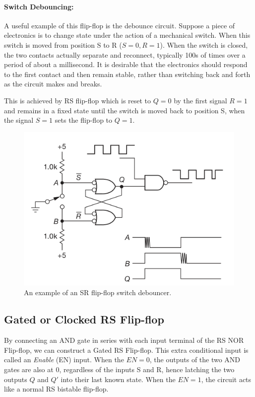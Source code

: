 \paragraph*{\textbf{Switch Debouncing:}}
A useful example of this flip-flop is the debounce circuit. Suppose a
piece of electronics is to change state under the action of a mechanical switch. When this
switch is moved from position S to R ($S=0, R=1$). When the switch is closed, the two contacts actually separate and reconnect, typically 100s of times over a period of about a millisecond. It is desirable that the electronics should respond to the first contact and then remain stable, rather than switching back and forth as the circuit makes and breaks. 

This is achieved by RS flip-flop which is reset to $Q=0$ by the first signal $R=1$ and remains in a fixed state until the switch is moved back to position S, when the signal $S=1$ sets the flip-flop to $Q=1$.

\begin{figure}[H]
    \centering
    \includegraphics[width=0.80\columnwidth]{images/debounce.png}
    \caption{An example of an SR flip-flop switch debouncer.}
\end{figure}

\subsection*{Gated or Clocked RS Flip-flop}
By connecting an AND gate in series with each input terminal of the RS NOR Flip-flop, we can construct a Gated RS Flip-flop. This extra conditional input is called an \textit{Enable} (EN) input.
When the $EN = 0$, the outputs of the two AND gates are also at 0, regardless of the inputs S and R, hence latching the two outputs $Q$ and $Q'$ into their last known state. When the $EN = 1$, the circuit acts like a normal RS bistable
flip-flop.

